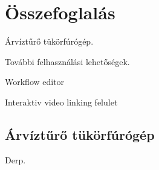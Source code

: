 \chapter{Összefoglalás}
 Árvíztűrő tükörfúrógép.

További felhasználási lehetőségek.

Workflow editor

Interaktiv video linking felulet 

\section{Árvíztűrő tükörfúrógép}
Derp.




